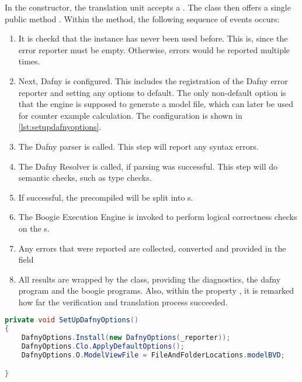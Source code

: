 In the constructor, the translation unit accepts a . The class then offers a single public method . Within the method, the following sequence of events occurs:
\begin{enumerate}
    \item It is checkd that the instance has never been used before. This is, since the error reporter must be empty. Otherwise, errors would be reported multiple times.
    \item Next, Dafny is configured. This includes the registration of the Dafny error reporter and setting any options to default. The only non-default option is that the engine is supposed to generate a model file, which can later be used for counter example calculation. The configuration is shown in \ref{lst:setupdafnyoptions}.
    \item The Dafny parser is called. This step will report any syntax errors.
    \item The Dafny Resolver is called, if parsing was successful. This step will do semantic checks, such as type checks.
    \item If successful, the precompiled  will be split into s.
    \item The Boogie Execution Engine is invoked to perform logical correctness checks on the s.
    \item Any errors that were reported are collected, converted and provided in the field 
    \item All results are wrapped by the  class, providing the diagnostics, the dafny program and the boogie programs. Also, within the property , it is remarked how far the verification and translation process succeeded.
\end{enumerate}




\begin{lstlisting}[language=csharp, caption={Setting up Dafny Options}, captionpos=b, label={lst:setupdafnyoptions}]
private void SetUpDafnyOptions()
{
    DafnyOptions.Install(new DafnyOptions(_reporter));
    DafnyOptions.Clo.ApplyDefaultOptions();
    DafnyOptions.O.ModelViewFile = FileAndFolderLocations.modelBVD;

}
\end{lstlisting}


